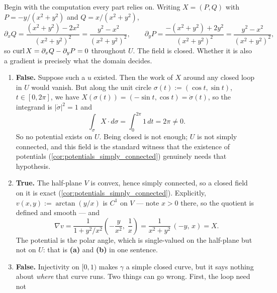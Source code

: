 \begin{exercisesolution}
\label{sol:angle_field_true_false}
Begin with the computation every part relies on. Writing $X = (P,Q)$ with $P = -y/(x^2+y^2)$ and
$Q = x/(x^2+y^2)$,
\[\partial_x Q = \frac{(x^2+y^2) - 2x^2}{(x^2+y^2)^2} = \frac{y^2-x^2}{(x^2+y^2)^2},
  \qquad
  \partial_y P = \frac{-(x^2+y^2) + 2y^2}{(x^2+y^2)^2} = \frac{y^2-x^2}{(x^2+y^2)^2},\]
so $\operatorname{curl} X = \partial_x Q - \partial_y P = 0$ throughout $U$. The field is closed. Whether it is
also a gradient is precisely what the domain decides.
\begin{enumerate}[label=\textbf{(\alph*)}]
  \item \textbf{False.} Suppose such a $u$ existed. Then the work of $X$ around any closed loop in
    $U$ would vanish. But along the unit circle $\sigma(t) := (\cos t, \sin t)$, $t \in [0,2\pi]$,
    we have $X(\sigma(t)) = (-\sin t, \cos t) = \dot\sigma(t)$, so the integrand is
    $\lvert\dot\sigma\rvert^2 = 1$ and
\[\int_\sigma X \cdot d\sigma = \int_0^{2\pi} 1 \, dt = 2\pi \neq 0 .\]
    So no potential exists on $U$. Being closed is not enough; $U$ is not simply connected, and this
    field is the standard witness that the existence of potentials
    (\cref{cor:potentials_simply_connected}) genuinely needs that hypothesis.
  \item \textbf{True.} The half-plane $V$ is convex, hence simply connected, so a closed field on it
    is exact (\cref{cor:potentials_simply_connected}). Explicitly, $v(x,y) := \arctan(y/x)$ is $C^1$
    on $V$ --- note $x > 0$ there, so the quotient is defined and smooth --- and
\[\nabla v = \frac{1}{1 + y^2/x^2}\left(-\frac{y}{x^2},\; \frac{1}{x}\right)
   = \frac{1}{x^2+y^2}\,(-y,\, x) = X .\]
    The potential is the polar angle, which is single-valued on the half-plane but not on $U$: that
    is \textbf{(a)} and \textbf{(b)} in one sentence.
  \item \textbf{False.} Injectivity on $[0,1)$ makes $\gamma$ a simple closed curve, but it says
    nothing about \emph{where} that curve runs. Two things can go wrong. First, the loop need not

\end{enumerate}
\end{exercisesolution}

